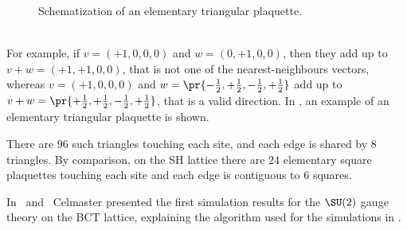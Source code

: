 \begin{figure}[!hbtp]
    \centering
    \caption{Schematization of an elementary triangular plaquette.}
    \label{3F:PlaqTriang}
\end{figure}\\
For example, if $v=(+1,0,0,0)$ and $w=(0,+1,0,0)$, then they add up to $v+w=(+1,+1,0,0)$, that is not one of the nearest-neighbours vectors, whereas $v=(+1,0,0,0)$ and $w=\pr{-\frac12,+\frac12,-\frac12,+\frac12}$ add up to $v+w=\pr{+\frac12,+\frac12,-\frac12,+\frac12}$, that is a valid direction.
In , an example of an elementary triangular plaquette is shown.

There are $96$ such triangles touching each site, and each edge is shared by $8$ triangles.
By comparison, on the SH lattice there are $24$ elementary square plaquettes touching each site and each edge is contiguous to $6$ squares.

In~\cite{Celmaster:1983hs} and~\cite{Celmaster:1983vy} Celmaster presented the first simulation results for the $\SU(2)$ gauge theory on the BCT lattice, explaining the algorithm used for the simulations in \cite{CELMASTER1985415}.

